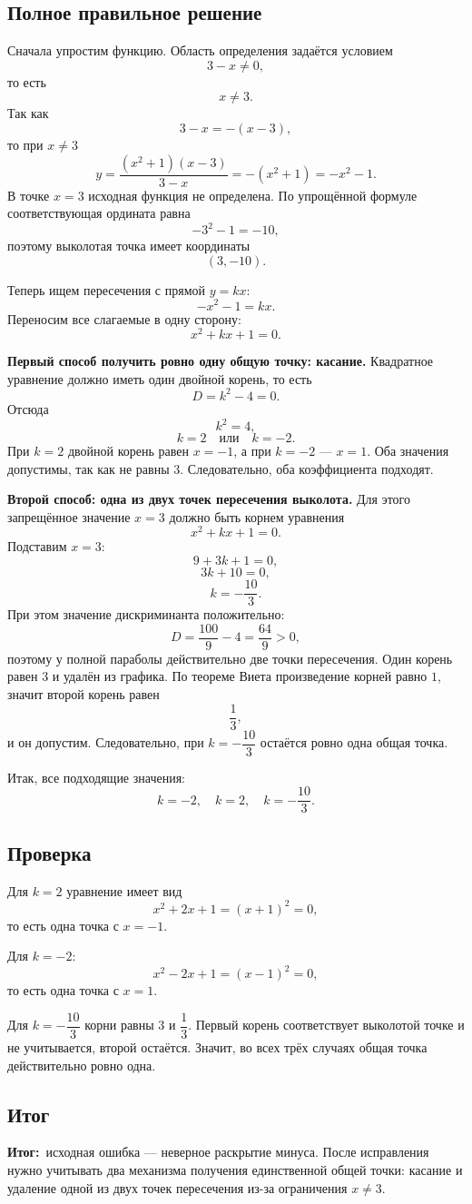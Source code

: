 \documentclass[12pt,a4paper]{article}
\newcommand{\resultlabel}{\textcolor{teal!60!black}{\textbf{Итог:}}}
\begin{document}
\subsection*{Полное правильное решение}
Сначала упростим функцию. Область определения задаётся условием
\[
3-x\ne0,
\]
то есть
\[
x\ne3.
\]
Так как
\[
3-x=-(x-3),
\]
то при $x\ne3$
\[
y=\frac{(x^2+1)(x-3)}{3-x}
=-(x^2+1)
=-x^2-1.
\]
В точке $x=3$ исходная функция не определена. По упрощённой формуле соответствующая ордината равна
\[
-3^2-1=-10,
\]
поэтому выколотая точка имеет координаты
\[
(3,-10).
\]

Теперь ищем пересечения с прямой $y=kx$:
\[
-x^2-1=kx.
\]
Переносим все слагаемые в одну сторону:
\[
x^2+kx+1=0.
\]

\textbf{Первый способ получить ровно одну общую точку: касание.}
Квадратное уравнение должно иметь один двойной корень, то есть
\[
D=k^2-4=0.
\]
Отсюда
\[
k^2=4,
\]
\[
k=2\quad\text{или}\quad k=-2.
\]
При $k=2$ двойной корень равен $x=-1$, а при $k=-2$ --- $x=1$. Оба значения допустимы, так как не равны $3$. Следовательно, оба коэффициента подходят.

\textbf{Второй способ: одна из двух точек пересечения выколота.}
Для этого запрещённое значение $x=3$ должно быть корнем уравнения
\[
x^2+kx+1=0.
\]
Подставим $x=3$:
\[
9+3k+1=0,
\]
\[
3k+10=0,
\]
\[
k=-\frac{10}{3}.
\]
При этом значение дискриминанта положительно:
\[
D=\frac{100}{9}-4=\frac{64}{9}>0,
\]
поэтому у полной параболы действительно две точки пересечения. Один корень равен $3$ и удалён из графика. По теореме Виета произведение корней равно $1$, значит второй корень равен
\[
\frac{1}{3},
\]
и он допустим. Следовательно, при $k=-\dfrac{10}{3}$ остаётся ровно одна общая точка.

Итак, все подходящие значения:
\[
\boxed{k=-2,\quad k=2,\quad k=-\frac{10}{3}}.
\]

\subsection*{Проверка}
Для $k=2$ уравнение имеет вид
\[
x^2+2x+1=(x+1)^2=0,
\]
то есть одна точка с $x=-1$.

Для $k=-2$:
\[
x^2-2x+1=(x-1)^2=0,
\]
то есть одна точка с $x=1$.

Для $k=-\dfrac{10}{3}$ корни равны $3$ и $\dfrac13$. Первый корень соответствует выколотой точке и не учитывается, второй остаётся. Значит, во всех трёх случаях общая точка действительно ровно одна.

\subsection*{Итог}
\resultlabel\ исходная ошибка --- неверное раскрытие минуса. После исправления нужно учитывать два механизма получения единственной общей точки: касание и удаление одной из двух точек пересечения из-за ограничения $x\ne3$.
\end{document}
